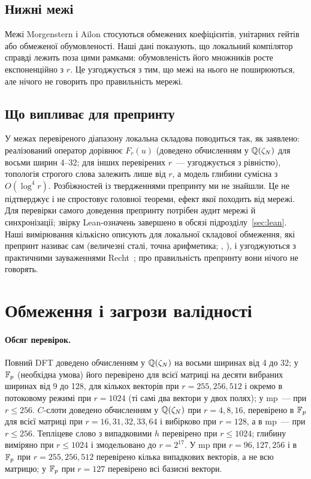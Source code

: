 \documentclass[11pt]{article}
\theoremstyle{plain}
\begin{document}
\subsection{Нижні межі}
Межі Morgenstern і Ailon стосуються обмежених коефіцієнтів, унітарних гейтів або обмеженої обумовленості. Наші дані показують, що локальний компілятор справді лежить поза цими рамками: обумовленість його множників росте експоненційно з $r$. Це узгоджується з тим, що межі на нього не поширюються, але нічого не говорить про правильність мережі.

\subsection{Що випливає для препринту}\label{sec:implications}
У межах перевіреного діапазону локальна складова поводиться так, як заявлено: реалізований оператор дорівнює $F_r(u)$ (доведено обчисленням у $\mathbb{Q}(\zeta_N)$ для восьми ширин 4--32; для інших перевірених $r$~--- узгоджується з рівністю), топологія строгого слова залежить лише від $r$, а модель глибини сумісна з $O(\log^4 r)$. Розбіжностей із твердженнями препринту ми не знайшли. Це не підтверджує і не спростовує головної теореми, ефект якої походить від мережі. Для перевірки самого доведення препринту потрібен аудит мережі й синхронізації; звірку Lean-означень завершено в обсязі підрозділу~\ref{sec:lean}. Наші вимірювання кількісно описують для локальної складової обмеження, які препринт називає сам (величезні сталі, точна арифметика; , ), і узгоджуються з практичними зауваженнями Recht~\citep{recht2026}; про правильність препринту вони нічого не говорять.

\section{Обмеження і загрози валідності}\label{sec:limitations}

\paragraph{Обсяг перевірок.}
Повний DFT доведено обчисленням у $\mathbb{Q}(\zeta_N)$ на восьми ширинах від 4 до 32; у $\mathbb{F}_p$ (необхідна умова) його перевірено для всієї матриці на десяти вибраних ширинах від 9 до 128, для кількох векторів при $r=255,256,512$ і окремо в потоковому режимі при $r=1024$ (ті самі два вектори у двох полях); у mp~--- при $r\le256$. $C$-слоти доведено обчисленням у $\mathbb{Q}(\zeta_N)$ при $r=4,8,16$, перевірено в $\mathbb{F}_p$ для всієї матриці при $r=16,31,32,33,64$ і вибірково при $r=128$, а в mp~--- при $r\le256$. Тепліцеве слово з випадковими $h$ перевірено при $r\le1024$; глибину виміряно при $r\le1024$ і змодельовано до $r=2^{17}$. У mp при $r=96,127,256$ і в $\mathbb{F}_p$ при $r=255,256,512$ перевірено кілька випадкових векторів, а не всю матрицю; у $\mathbb{F}_p$ при $r=127$ перевірено всі базисні вектори.
\end{document}
